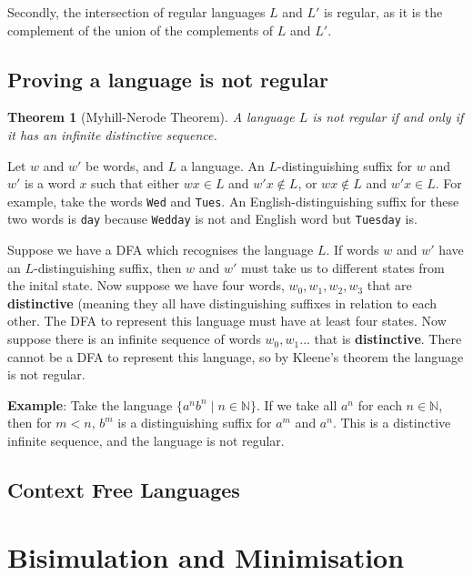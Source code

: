 \documentclass[11pt]{article}
\newtheorem{theorem}{Theorem}
\begin{document}
	\par 
	Secondly, the intersection of regular languages $L$ and $L'$ is regular, as it is the complement of the union of the complements of $L$ and $L'$.
	
	\subsection{Proving a language is not regular}
	\begin{theorem}[Myhill-Nerode Theorem]
	A language $L$ is not regular if and only if it has an infinite distinctive sequence.
	\end{theorem}
	
	Let $w$ and $w'$ be words, and $L$ a language. An $L$-distinguishing suffix for $w$ and $w'$ is a word $x$ such that either $wx \in L$ and $w'x \notin L$, or $wx \notin L$ and $w'x \in L$. For example, take the words \texttt{Wed} and \texttt{Tues}. An English-distinguishing suffix for these two words is \texttt{day} because \texttt{Wedday} is not and English word but \texttt{Tuesday} is.
	
	\par Suppose we have a DFA which recognises the language $L$. If words $w$ and $w'$ have an $L$-distinguishing suffix, then $w$ and $w'$ must take us to different states from the inital state. Now suppose we have four words, $w_{0}, w_{1}, w_{2}, w_{3}$ that are \textbf{distinctive} (meaning they all have distinguishing suffixes in relation to each other. The DFA to represent this language must have at least four states. Now suppose there is an infinite sequence of words $w_{0}, w_{1}...$ that is \textbf{distinctive}. There cannot be a DFA to represent this language, so by Kleene's theorem the language is not regular.
	
	\par 
	\textbf{Example}: Take the language $\{a^{n}b^{n} \;|\; n \in \mathbb{N}\}$. If we take all $a^{n}$ for each $n \in \mathbb{N}$, then for $m < n$, $b^{m}$ is a distinguishing suffix for $a^{m}$ and $a^{n}$. This is a distinctive infinite sequence, and the language is not regular.
	
	\subsection{Context Free Languages}
	
	\section{Bisimulation and Minimisation}
\end{document}
